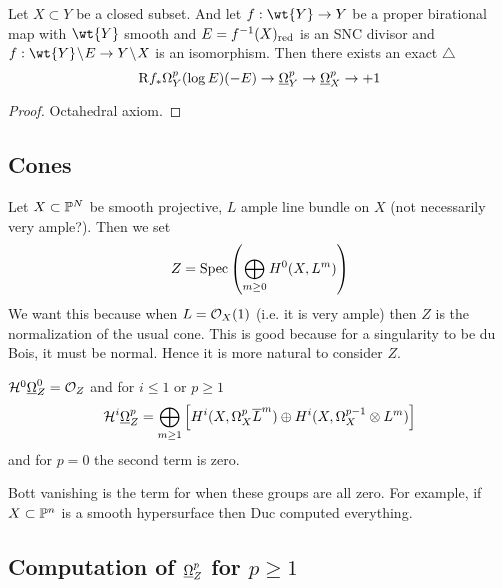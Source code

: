 \documentclass[12pt]{article}
\newcommand{\R}{\mathrm{R}}
\renewcommand{\cH}{\mathcal{H}}
\begin{document}
\begin{prop}
Let $X \subset Y$ be a closed subset. And let $f : \wt{Y} \to Y$ be a proper birational map with $\wt{Y}$ smooth and $E = f^{-1}(X)_{\red}$ is an SNC divisor and $f : \wt{Y} \sm E \to Y \sm X$ is an isomorphism. Then there exists an exact $\triangle$ 
\[ \R f_* \Omega_Y^p(\log{E})(-E) \to \ul{\Omega}_Y^p \to \ul{\Omega}_X^p \to +1 \]
\end{prop}

\begin{proof}
Octahedral axiom.
\end{proof}

\subsection{Cones}

\newcommand{\ulO}{\ul{\Omega}}

Let $X \subset \P^N$ be smooth projective, $L$ ample line bundle on $X$ (not necessarily very ample?). Then we set
\[ Z = \Spec{\bigoplus_{m \ge 0} H^0(X, L^m)} \]
We want this because when $L = \struct{X}(1)$ (i.e. it is very ample) then $Z$ is the normalization of the usual cone. This is good because for a singularity to be du Bois, it must be normal. Hence it is more natural to consider $Z$. 

\begin{prop}
$\cH^0 \ul{\Omega}_Z^0 = \struct{Z}$ and for $i \le 1$ or $p \ge 1$
\[ \cH^i \ulO_Z^p = \bigoplus_{m \ge 1} \left[ H^i(X, \Omega_X^p \ol L^m) \oplus H^i(X, \Omega_X^{p-1} \ot L^m) \right] \]
and for $p = 0$ the second term is zero. 
\end{prop}

\begin{rmk}
Bott vanishing is the term for when these groups are all zero. For example, if $X \subset \P^n$ is a smooth hypersurface then Duc computed everything. 
\end{rmk}

\subsection{Computation of $\ulO^p_Z$ for $p \ge 1$}
\end{document}
